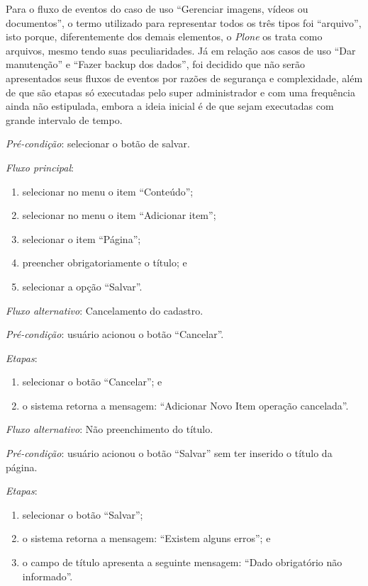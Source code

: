 Para o fluxo de eventos do caso de uso ``Gerenciar imagens, vídeos ou documentos'', o termo utilizado para representar todos os três tipos foi ``arquivo'', isto porque, diferentemente dos demais elementos, o \textit{Plone} os trata como arquivos, mesmo tendo suas peculiaridades. Já em relação aos casos de uso ``Dar manutenção'' e ``Fazer backup dos dados'', foi decidido que não serão apresentados seus fluxos de eventos por razões de segurança e complexidade, além de que são etapas só executadas pelo super administrador e com uma frequência ainda não estipulada, embora a ideia inicial é de que sejam executadas com grande intervalo de tempo.  


\vspace{0.7cm}

\noindent \textit{Pré-condição}: selecionar o botão de salvar.

\noindent \textit{Fluxo principal}:

\begin{enumerate}
    \item selecionar no menu o item ``Conteúdo'';
    \item selecionar no menu o item ``Adicionar item'';
    \item selecionar o item ``Página'';
    \item preencher obrigatoriamente o título; e
    \item selecionar a opção ``Salvar''.
\end{enumerate}

\noindent \textit{Fluxo alternativo}: Cancelamento do cadastro.

\noindent \textit{Pré-condição}: usuário acionou o botão ``Cancelar''.

\noindent \textit{Etapas}:

\begin{enumerate}
    \item selecionar o botão ``Cancelar''; e
    \item o sistema retorna a mensagem: ``Adicionar Novo Item operação cancelada''.
\end{enumerate}

\noindent \textit{Fluxo alternativo}: Não preenchimento do título.

\noindent \textit{Pré-condição}: usuário acionou o botão ``Salvar'' sem ter inserido o título da página.

\noindent \textit{Etapas}:

\begin{enumerate}
    \item selecionar o botão ``Salvar'';
    \item o sistema retorna a mensagem: ``Existem alguns erros''; e
    \item o campo de título apresenta a seguinte mensagem: ``Dado obrigatório não informado''.
\end{enumerate}



